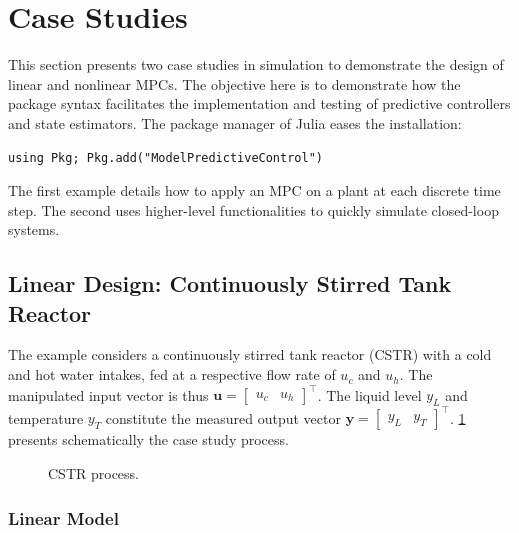 \section{Case Studies}
\label{sec:case_studies}

This section presents two case studies in simulation to demonstrate the design of linear and nonlinear MPCs. The objective here is to demonstrate how the package syntax facilitates the implementation and testing of predictive controllers and state estimators. The package manager of Julia eases the installation:
\begin{verbatim}
using Pkg; Pkg.add("ModelPredictiveControl")
\end{verbatim}
The first example details how to apply an MPC on a plant at each discrete time step. The second uses higher-level functionalities to quickly simulate closed-loop systems.

\subsection{Linear Design: Continuously Stirred Tank Reactor}

The example considers a continuously stirred tank reactor (CSTR) with a cold and hot water intakes, fed at a respective flow rate of $u_c$ and $u_h$. The manipulated input vector is thus $\mathbf{u} = [\begin{smallmatrix}u_c & u_h\end{smallmatrix}]^\intercal$. The liquid level $y_L$ and temperature $y_T$ constitute the measured output vector $\mathbf{y} = [\begin{smallmatrix}y_L & y_T\end{smallmatrix}]^\intercal$. \cref{fig:cstr} presents schematically the case study process.

\begin{figure}[ht]
    \centering
    
    \caption{CSTR process.}\label{fig:cstr}
\end{figure}

\subsubsection{Linear Model}

